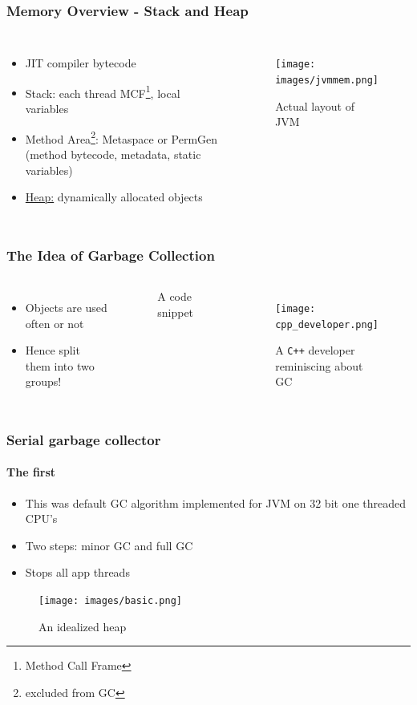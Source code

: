 \documentclass{beamer}
\begin{document}
\begin{frame}
    \frametitle{Memory Overview - Stack and Heap}
    \begin{columns}
        \begin{itemize}
            \item JIT compiler bytecode
            \item Stack: each thread MCF\footnote{Method Call Frame}, local variables 
            \item Method Area\footnote{excluded from GC}: Metaspace or PermGen (method bytecode, metadata, static variables)
            \item \underline{Heap:} dynamically allocated objects
        \end{itemize} 
       
        \begin{figure}
            \centering
            \texttt{[image: images/jvmmem.png]}
            \caption{Actual layout of JVM\cite{noauthor_memory_nodate}}
        \end{figure}
        
      \end{columns}
 
\end{frame}

\begin{frame}
    \frametitle{The Idea of Garbage Collection}
    \begin{columns}
        \begin{itemize}
            \item Objects are used often or not
            \item Hence split them into two groups!  
        \end{itemize}
        \begin{figure}
            \caption[bigdecimal]{A code snippet}
        \end{figure}
        \begin{figure}
            \texttt{[image: cpp\_developer.png]}
            \caption[dev]{A \texttt{C++} developer reminiscing about GC}
        \end{figure}

    \end{columns}
\end{frame}


\begin{frame}
    \frametitle{Serial garbage collector}
    \framesubtitle{The first}
    \begin{itemize}
        \item This was default GC algorithm implemented for JVM on 32 bit one threaded CPU's 
        \item Two steps: minor GC and full GC
        \item Stops all app threads 
    \end{itemize}
    \begin{figure}
        \texttt{[image: images/basic.png]}
        \caption[javaheap]{An idealized heap\cite{book} }
    \end{figure}
\end{frame}
\end{document}
